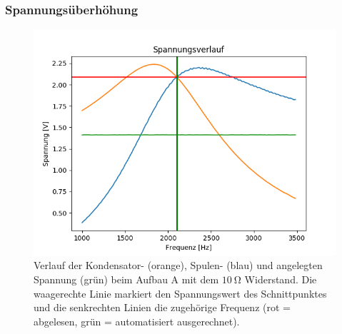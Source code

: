 \documentclass[12pt,a4paper]{article}
\begin{document}
\subsubsection{Spannungsüberhöhung}
\begin{figure}[H]
	\centering
	\includegraphics[scale=0.7]{Bilder/Serie_Spannungsueberhoehung_A_10.png}
	\caption{Verlauf der Kondensator- (orange), Spulen- (blau) und angelegten Spannung (grün) beim Aufbau A mit dem $\SI{10}{\ohm}$ Widerstand. Die waagerechte Linie markiert den Spannungswert des Schnittpunktes und die senkrechten Linien die zugehörige Frequenz (rot = abgelesen, grün = automatisiert ausgerechnet).}
	\label{fig:Serie_Spannungsueberhoehung_A_10}
\end{figure}
\end{document}
